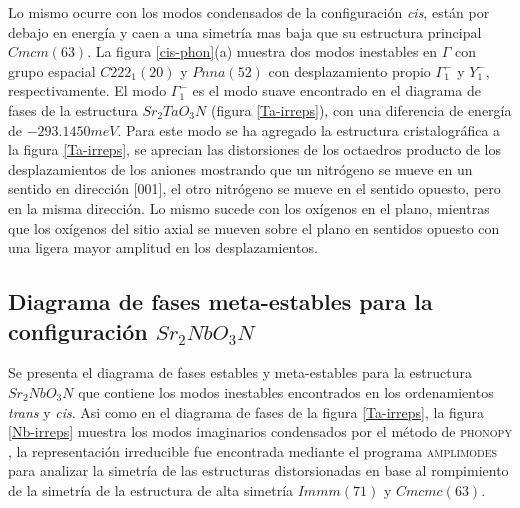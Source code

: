 Lo mismo ocurre con los modos condensados de la configuración \emph{cis}, están por debajo en energía y caen a una simetría mas baja que su estructura principal $Cmcm(63)$. La figura \ref{cis-phon}(a) muestra dos modos inestables en $\Gamma$ con grupo espacial $C222_{1}(20)$ y $Pnna(52)$ con desplazamiento propio $\Gamma_{1}^{-}$ y $Y_{1}^{-}$, respectivamente. El modo $\Gamma_{1}^{-}$ es el modo suave encontrado en el diagrama de fases de la estructura $Sr_{2}TaO_{3}N$ (figura \ref{Ta-irreps}),  con una diferencia de energía de $-293.1450meV$. Para este modo se ha agregado la estructura cristalográfica a la figura \ref{Ta-irreps}, se aprecian las distorsiones de los octaedros producto de los desplazamientos de los aniones mostrando que un nitrógeno se mueve en un sentido en dirección [001], el otro nitrógeno se mueve en el sentido opuesto, pero en la misma dirección. Lo mismo sucede con los oxígenos en el plano, mientras que los oxígenos del sitio axial se mueven sobre el plano en sentidos opuesto con una ligera mayor amplitud en los desplazamientos. 

\subsection{Diagrama de fases meta-estables para la configuración $Sr_{2}NbO_{3}N$}

Se presenta el diagrama de fases estables y meta-estables para la estructura $Sr_{2}NbO_{3}N$ que contiene los modos inestables encontrados en los ordenamientos \emph{trans} y \emph{cis}. Asi como en el diagrama de fases de la figura \ref{Ta-irreps}, la figura \ref{Nb-irreps} muestra los modos imaginarios condensados por el método de \textsc{phonopy} \cite{Togo2015phonopy}, la representación irreducible fue encontrada mediante el programa \textsc{amplimodes} \cite{Orobengoa2009amplimodes} para analizar la simetría de las estructuras distorsionadas en base al rompimiento de la simetría de la estructura de alta simetría $Immm(71)$ y $Cmcmc(63)$. 


